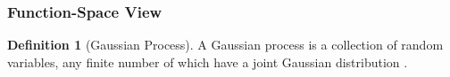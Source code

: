 \documentclass[12pt,a4paper]{report}
\theoremstyle{definition}
\newtheorem{definition}{Definition}[section]
\begin{document}
%
%
%
%
%
%
%
%
%
%

\subsubsection{Function-Space View}

\begin{definition}[Gaussian Process]
A Gaussian process is a collection of random variables, any finite number of which have a joint Gaussian distribution \citep{RasmussenWilliams2006}.
\end{definition}
\end{document}
